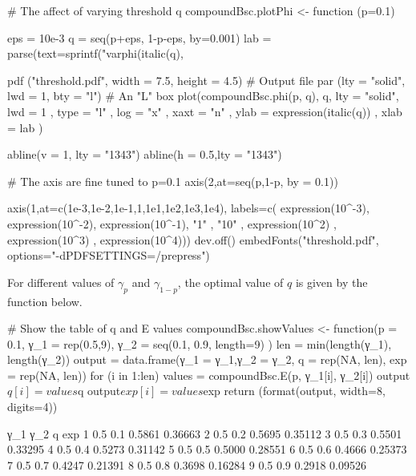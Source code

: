 \starttyping
# The affect of varying threshold q
compoundBsc.plotPhi <- function (p=0.1)
{
  eps = 10e-3
  q   = seq(p+eps, 1-p-eps, by=0.001)            
  lab = parse(text=sprintf("varphi(italic(q), %

  pdf ("threshold.pdf", width = 7.5, height = 4.5)  # Output file
  par (lty = "solid", lwd = 1, bty = "l")           # An "L" box
  plot(compoundBsc.phi(p, q), q,
       lty  = "solid",
       lwd  = 1      ,
       type = "l"    ,
       log  = "x"    ,
       xaxt = "n"    ,
       ylab = expression(italic(q)) ,
       xlab = lab    )

  abline(v = 1,  lty = "1343")
  abline(h = 0.5,lty = "1343")

  # The axis are fine tuned to p=0.1
  axis(2,at=seq(p,1-p, by = 0.1))

  axis(1,at=c(1e-3,1e-2,1e-1,1,1e1,1e2,1e3,1e4), 
  labels=c(
             expression(10^-3), 
             expression(10^-2), 
             expression(10^-1), 
             "1"              , 
             "10"             , 
             expression(10^2) , 
             expression(10^3) ,
             expression(10^4)))
  dev.off()
  embedFonts("threshold.pdf", options="-dPDFSETTINGS=/prepress")
}
\stoptyping

{\externalfigure[threshold]}

For different values of $γ_p$ and $γ_{1-p}$, the optimal value of
$q$ is given by the function below.

\starttyping
# Show the table of q and E values
compoundBsc.showValues <- function(p = 0.1,
                                   γ_1 = rep(0.5,9), 
                                   γ_2 = seq(0.1, 0.9, length=9) )
{
  len    = min(length(γ_1), length(γ_2))
  output = data.frame(γ_1 = γ_1,γ_2 = γ_2,  q = rep(NA, len), exp = rep(NA, len))
  for (i in 1:len)
  {
    values        = compoundBsc.E(p, γ_1[i], γ_2[i])
    output$q[i]   = values$q 
    output$exp[i] = values$exp
  }
  return (format(output, width=8, digits=4))
}
\stoptyping

\starttyping
       γ_1      γ_2        q      exp
1      0.5      0.1   0.5861  0.36663
2      0.5      0.2   0.5695  0.35112
3      0.5      0.3   0.5501  0.33295
4      0.5      0.4   0.5273  0.31142
5      0.5      0.5   0.5000  0.28551
6      0.5      0.6   0.4666  0.25373
7      0.5      0.7   0.4247  0.21391
8      0.5      0.8   0.3698  0.16284
9      0.5      0.9   0.2918  0.09526
\stoptyping

